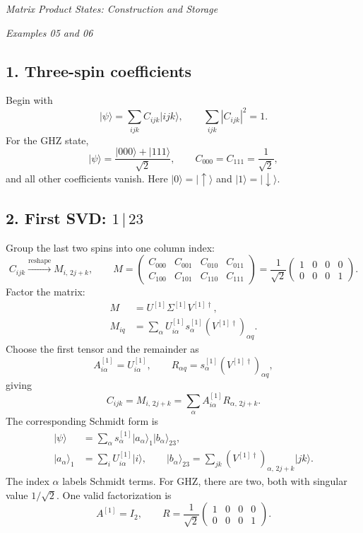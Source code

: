 \documentclass[11pt]{article}
\newcommand{\ket}[1]{\lvert #1\rangle}
\newcommand{\heading}[1]{\begin{center}\large\textit{#1}\end{center}}
\begin{document}
\heading{Matrix Product States: Construction and Storage}
\textit{Examples 05 and 06}

\subsection*{1. Three-spin coefficients}
Begin with
\begin{equation}
\ket{\psi}=\sum_{ijk}C_{ijk}\ket{ijk},\qquad
\sum_{ijk}|C_{ijk}|^2=1.
\end{equation}
For the GHZ state,
\begin{equation}
\ket{\psi}=\frac{\ket{000}+\ket{111}}{\sqrt2},\qquad
C_{000}=C_{111}=\frac1{\sqrt2},
\end{equation}
and all other coefficients vanish. Here $\ket0=\ket\uparrow$ and $\ket1=\ket\downarrow$.

\subsection*{2. First SVD: $1\,|\,23$}
Group the last two spins into one column index:
\begin{equation}
C_{ijk}\xrightarrow{\text{reshape}}M_{i,\,2j+k},\qquad
M=\begin{pmatrix}C_{000}&C_{001}&C_{010}&C_{011}\\
C_{100}&C_{101}&C_{110}&C_{111}\end{pmatrix}
=\frac1{\sqrt2}\begin{pmatrix}1&0&0&0\\0&0&0&1\end{pmatrix}.
\end{equation}
Factor the matrix:
\begin{align}
M&=U^{[1]}\Sigma^{[1]}V^{[1]\dagger},\\
M_{iq}&=\sum_\alpha U^{[1]}_{i\alpha}s^{[1]}_\alpha
(V^{[1]\dagger})_{\alpha q}.
\end{align}
Choose the first tensor and the remainder as
\begin{equation}
A^{[1]}_{i\alpha}=U^{[1]}_{i\alpha},\qquad
R_{\alpha q}=s^{[1]}_\alpha(V^{[1]\dagger})_{\alpha q},
\end{equation}
giving
\begin{equation}
C_{ijk}=M_{i,\,2j+k}=\sum_\alpha A^{[1]}_{i\alpha}R_{\alpha,\,2j+k}.
\end{equation}
The corresponding Schmidt form is
\begin{align}
\ket\psi&=\sum_\alpha s^{[1]}_\alpha\ket{a_\alpha}_1\ket{b_\alpha}_{23},\\
\ket{a_\alpha}_1&=\sum_i U^{[1]}_{i\alpha}\ket i,
\qquad\ket{b_\alpha}_{23}=\sum_{jk}(V^{[1]\dagger})_{\alpha,\,2j+k}\ket{jk}.
\end{align}
The index $\alpha$ labels Schmidt terms. For GHZ, there are two, both with singular value $1/\sqrt2$. One valid factorization is
\begin{equation}
A^{[1]}=I_2,\qquad R=\frac1{\sqrt2}\begin{pmatrix}1&0&0&0\\0&0&0&1\end{pmatrix}.
\end{equation}
\end{document}
